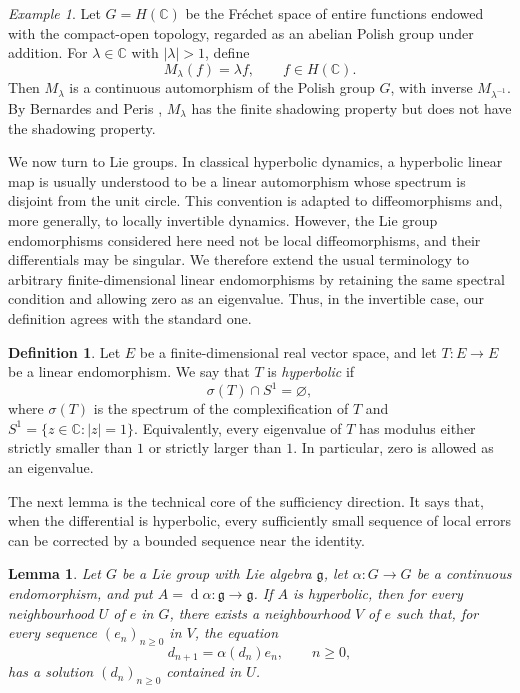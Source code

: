 \documentclass[12pt]{amsart}
\newtheorem{lemma}[theorem]{Lemma}
\theoremstyle{definition}
\newtheorem{definition}[theorem]{Definition}
\numberwithin{equation}{section}
\theoremstyle{remark}
\newtheorem{example}[theorem]{Example}
\DeclareMathOperator{\di}{d}
\begin{document}
\begin{example}
Let $G=H(\mathbb C)$ be the Fréchet space of entire functions endowed with
the compact-open topology, regarded as an abelian Polish group under addition.
For $\lambda\in\mathbb C$ with $|\lambda|>1$, define
\[
M_\lambda(f)=\lambda f,\qquad f\in H(\mathbb C).
\]
Then $M_\lambda$ is a continuous automorphism of the Polish group $G$, with
inverse $M_{\lambda^{-1}}$. By Bernardes and Peris \cite{BernardesPeris}, $M_\lambda$ has the
finite shadowing property but does not have the shadowing property.
\end{example}


We now turn to Lie groups. In classical hyperbolic dynamics, a hyperbolic
linear map is usually understood to be a linear automorphism whose spectrum
is disjoint from the unit circle. This convention is adapted to
diffeomorphisms and, more generally, to locally invertible dynamics.
However, the Lie group endomorphisms considered here need not be local
diffeomorphisms, and their differentials may be singular. We therefore
extend the usual terminology to arbitrary finite-dimensional linear
endomorphisms by retaining the same spectral condition and allowing zero
as an eigenvalue. Thus, in the invertible case, our definition agrees with
the standard one.

\begin{definition}
Let $E$ be a finite-dimensional real vector space, and let $T:E\to E$ be a
linear endomorphism. We say that $T$ is \emph{hyperbolic} if
\[
\sigma(T)\cap S^1=\varnothing,
\]
where $\sigma(T)$ is the spectrum of the complexification of $T$ and
$S^1=\{z\in\mathbb C:|z|=1\}$. Equivalently, every eigenvalue of $T$ has
modulus either strictly smaller than $1$ or strictly larger than $1$.
In particular, zero is allowed as an eigenvalue.
\end{definition}

The next lemma is the technical core of the sufficiency direction. It says that, when the differential is hyperbolic, every sufficiently small sequence of local errors can be corrected by a bounded sequence near the identity.

\begin{lemma}\label{lem:local-error-equation}
Let $G$ be a Lie group with Lie algebra $\mathfrak g$, let $\alpha:G\to G$ be a continuous endomorphism,
and put $A=\di\alpha:\mathfrak g\to\mathfrak g$. If $A$ is hyperbolic, then
for every neighbourhood $U$ of $e$ in $G$, there exists a neighbourhood
$V$ of $e$ such that, for every sequence $(e_n)_{n\geq 0}$ in $V$, the
equation
\begin{equation}\label{eq:error-equation}
d_{n+1}=\alpha(d_n)e_n,\qquad n\geq 0,
\end{equation}
has a solution $(d_n)_{n\geq 0}$ contained in $U$.
\end{lemma}
\end{document}
